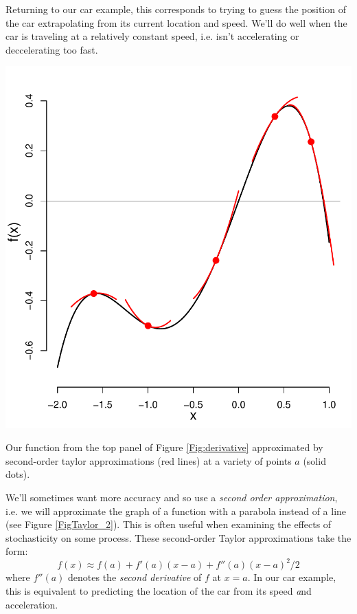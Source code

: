 Returning to our car example, this corresponds to trying to guess the
position of the car
extrapolating from its current location and speed. We'll do well when
the car is traveling at a relatively constant speed, i.e. isn't
accelerating or deccelerating too fast. 
 

 \begin{marginfigure}
 \begin{center}
   \includegraphics[width=\textwidth]{math_background/calc_pics/Taylor_2.pdf}\end{center}
 \caption{Our function from the top panel of Figure
   \ref{Fig:derivative} approximated by second-order taylor
   approximations (red lines) at a variety of points $a$ (solid
   dots).  }\label{FigTaylor_2}
\end{marginfigure}
We'll sometimes want more accuracy and so use a
\emph{second order approximation},
i.e. we will approximate the graph of a function with a parabola instead of a
line (see Figure \ref{FigTaylor_2}). This is often useful when examining the effects of
stochasticity on some process. These second-order Taylor
approximations take the form: 
\begin{equation}
f(x)\approx f(a)+f'(a)(x-a)+f''(a)(x-a)^2/2
\end{equation}
where $f''(a)$ denotes the  \emph{second derivative} of $f$ at
$x=a$. In our car example, this is equivalent to predicting the
location of the car from its speed {\emph and} acceleration. 

